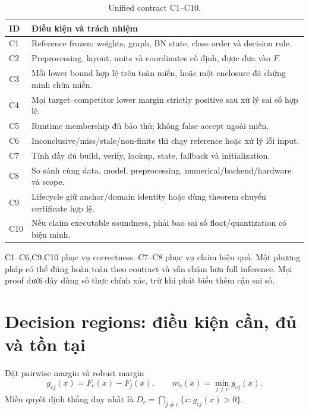\documentclass[11pt,a4paper]{article}
\theoremstyle{remark}
\begin{document}
\begin{table}[!htbp]\centering
\caption{Unified contract C1--C10.}
\begin{tabularx}{\linewidth}{@{}p{1cm}Y@{}}\toprule
ID & Điều kiện và trách nhiệm\\\midrule
C1 & Reference frozen: weights, graph, BN state, class order và decision rule.\\
C2 & Preprocessing, layout, units và coordinates cố định, được đưa vào $F$.\\
C3 & Mỗi lower bound hợp lệ trên toàn miền, hoặc một enclosure đã chứng minh chứa miền.\\
C4 & Mọi target--competitor lower margin strictly positive sau xử lý sai số hợp lệ.\\
C5 & Runtime membership đủ bảo thủ; không false accept ngoài miền.\\
C6 & Inconclusive/miss/stale/non-finite thì chạy reference hoặc xử lý lỗi input.\\
C7 & Tính đầy đủ build, verify, lookup, state, fallback và initialization.\\
C8 & So sánh cùng data, model, preprocessing, numerical/backend/hardware và scope.\\
C9 & Lifecycle giữ anchor/domain identity hoặc dùng theorem chuyển certificate hợp lệ.\\
C10 & Nếu claim executable soundness, phải bao sai số float/quantization có biện minh.\\\bottomrule
\end{tabularx}
\end{table}
C1--C6,C9,C10 phục vụ correctness. C7--C8 phục vụ claim hiệu quả. Một phương
pháp có thể đúng hoàn toàn theo contract và vẫn chậm hơn full inference.
Mọi proof dưới đây dùng số thực chính xác, trừ khi phát biểu thêm cận sai số.

\section{Decision regions: điều kiện cần, đủ và tồn tại}
Đặt pairwise margin và robust margin
\begin{equation}
 g_{cj}(x)=F_c(x)-F_j(x),\qquad
 m_c(x)=\min_{j\ne c}g_{cj}(x).
 \label{eq:margin}
\end{equation}
Miền quyết định thắng duy nhất là
$D_c=\bigcap_{j\ne c}\{x:g_{cj}(x)>0\}$.
\end{document}
